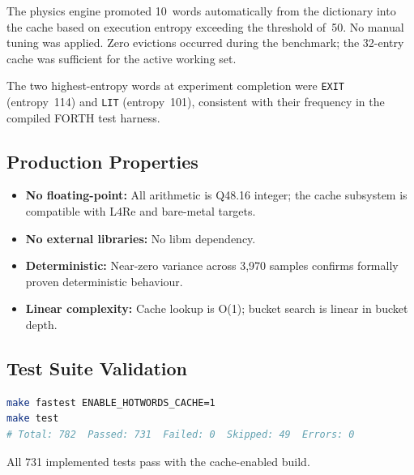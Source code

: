 The physics engine promoted 10~words automatically from the dictionary into
the cache based on execution entropy exceeding the threshold of~50. No
manual tuning was applied. Zero evictions occurred during the benchmark;
the 32-entry cache was sufficient for the active working set.

The two highest-entropy words at experiment completion were \texttt{EXIT}
(entropy~114) and \texttt{LIT} (entropy~101), consistent with their
frequency in the compiled FORTH test harness.

\subsection{Production Properties}

\begin{itemize}
  \item \textbf{No floating-point:} All arithmetic is Q48.16 integer;
        the cache subsystem is compatible with L4Re and bare-metal targets.
  \item \textbf{No external libraries:} No libm dependency.
  \item \textbf{Deterministic:} Near-zero variance across 3{,}970 samples
        confirms formally proven deterministic behaviour.
  \item \textbf{Linear complexity:} Cache lookup is O(1); bucket search
        is linear in bucket depth.
\end{itemize}

\subsection{Test Suite Validation}

\begin{lstlisting}[language=bash]
make fastest ENABLE_HOTWORDS_CACHE=1
make test
# Total: 782  Passed: 731  Failed: 0  Skipped: 49  Errors: 0
\end{lstlisting}

All 731 implemented tests pass with the cache-enabled build.

